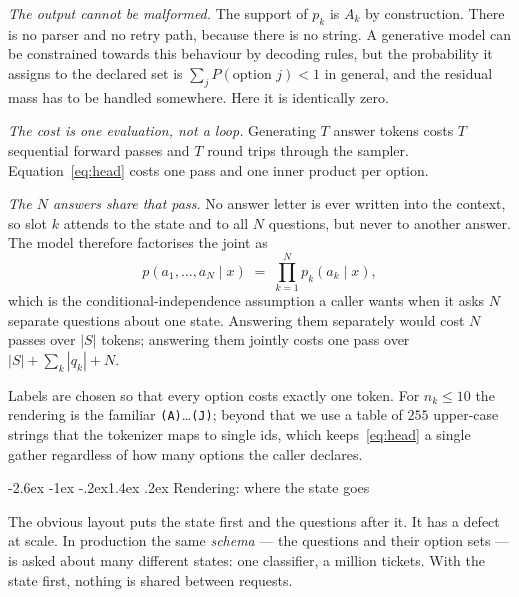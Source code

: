 \documentclass[11pt]{article}
\makeatletter
\renewcommand\subsection{\@startsection{subsection}{2}{\z@}%
  {-2.6ex \@plus -1ex \@minus -.2ex}{1.4ex \@plus.2ex}%
  {\normalfont\normalsize\bfseries\color{accent!85!black}}}
\newcommand{\1}{\mathbf{1}}
\makeatother
\begin{document}
\emph{The output cannot be malformed.} The support of $p_k$ is $A_k$ by construction. There is no
parser and no retry path, because there is no string. A generative model can be constrained towards
this behaviour by decoding rules, but the probability it assigns to the declared set is
$\sum_{j} P(\text{option } j) < 1$ in general, and the residual mass has to be handled somewhere.
Here it is identically zero.

\emph{The cost is one evaluation, not a loop.} Generating $T$ answer tokens costs $T$ sequential
forward passes and $T$ round trips through the sampler. Equation~\eqref{eq:head} costs one pass and
one inner product per option.

\emph{The $N$ answers share that pass.} No answer letter is ever written into the context, so slot
$k$ attends to the state and to all $N$ questions, but never to another answer. The model therefore
factorises the joint as
\begin{equation}
p(a_1,\dots,a_N \mid x) \;=\; \prod_{k=1}^{N} p_k(a_k \mid x),
\end{equation}
which is the conditional-independence assumption a caller wants when it asks $N$ separate questions
about one state. Answering them separately would cost $N$ passes over $|S|$ tokens; answering them
jointly costs one pass over $|S| + \sum_k |q_k| + N$.

Labels are chosen so that every option costs exactly one token. For $n_k \le 10$ the rendering is
the familiar \texttt{(A)}\dots\texttt{(J)}; beyond that we use a table of $255$ upper-case strings
that the tokenizer maps to single ids, which keeps~\eqref{eq:head} a single gather regardless of how
many options the caller declares.

\subsection{Rendering: where the state goes}
\label{sec:layout}

The obvious layout puts the state first and the questions after it. It has a defect at scale. In
production the same \emph{schema} --- the questions and their option sets --- is asked about many
different states: one classifier, a million tickets. With the state first, nothing is shared between
requests.
\end{document}

